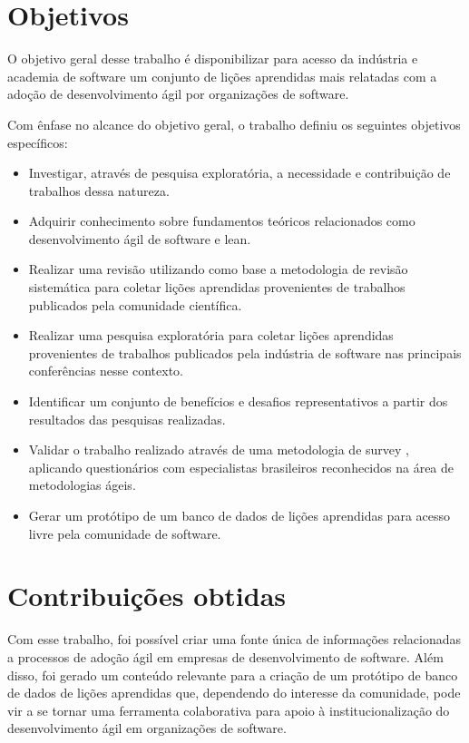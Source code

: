 \section{Objetivos} 

O objetivo geral desse trabalho é disponibilizar para acesso da indústria e academia de software um conjunto de lições aprendidas mais relatadas com a adoção de desenvolvimento ágil por organizações de software.

Com ênfase no alcance do objetivo geral, o trabalho definiu os seguintes objetivos específicos:

\begin{itemize}
	\item Investigar, através de pesquisa exploratória, a necessidade e contribuição de trabalhos dessa natureza.
	\item Adquirir conhecimento sobre fundamentos teóricos relacionados como desenvolvimento ágil de software e lean.
	\item Realizar uma revisão utilizando como base a metodologia de revisão sistemática \cite{Barbara04} para coletar lições aprendidas provenientes de trabalhos publicados pela comunidade científica.
	\item Realizar uma pesquisa exploratória para coletar lições aprendidas provenientes de trabalhos publicados pela indústria de software nas principais conferências nesse contexto.
	\item Identificar um conjunto de benefícios e desafios representativos a partir dos resultados das pesquisas realizadas.
	\item Validar o trabalho realizado através de uma metodologia de survey \cite{Babbie1990}, aplicando questionários com especialistas brasileiros reconhecidos na área de metodologias ágeis.
	\item Gerar um protótipo de um banco de dados de lições aprendidas para acesso livre pela comunidade de software.
\end{itemize}

\section{Contribuições obtidas}

Com esse trabalho, foi possível criar uma fonte única de informações relacionadas a processos de adoção ágil em empresas de desenvolvimento de software. Além disso, foi gerado um conteúdo relevante para a criação de um protótipo de banco de dados de lições aprendidas que, dependendo do interesse da comunidade, pode vir a se tornar uma ferramenta colaborativa para apoio à institucionalização do desenvolvimento ágil em organizações de software.

